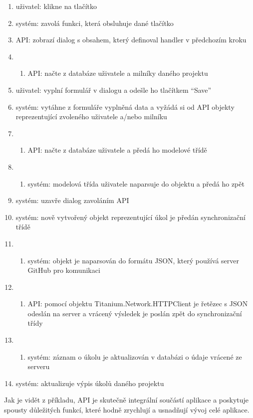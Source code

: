 \begin{enumerate}
\item uživatel: klikne na tlačítko 
\item systém: zavolá funkci, která obsluhuje dané tlačítko
\item API: zobrazí dialog s obsahem, který definoval handler v předchozím kroku
\item \begin{enumerate}
\item API: načte z databáze uživatele a milníky daného projektu
\end{enumerate}
\item uživatel: vyplní formulář v dialogu a odešle ho tlačítkem ``Save''
\item systém: vytáhne z formuláře vyplněná data a vyžádá si od API objekty reprezentující zvoleného uživatele a\slash nebo milníku
\item \begin{enumerate}
\item API: načte z databáze uživatele a předá ho modelové třídě
\end{enumerate}
\item \begin{enumerate}
\item systém: modelová třída uživatele naparsuje do objektu a předá ho zpět
\end{enumerate}
\item systém: uzavře dialog zavoláním API
\item systém: nově vytvořený objekt reprezentující úkol je předán synchronizační třídě
\item \begin{enumerate}
\item systém: objekt je naparsován do formátu JSON, který používá server GitHub pro komunikaci
\end{enumerate}
\item \begin{enumerate}
\item API: pomocí objektu Titanium.Network.HTTPClient je řetězec s JSON odeslán na server a vrácený výsledek je poslán zpět do synchronizační třídy
\end{enumerate}
\item \begin{enumerate}
\item systém: záznam o úkolu je aktualizován v databázi o údaje vrácené ze serveru
\end{enumerate}
\item systém: aktualizuje výpis úkolů daného projektu
\end{enumerate}

Jak je vidět z příkladu, API je skutečně integrální součástí aplikace a poskytuje spousty důležitých funkcí, které hodně zrychlují a usnadňují vývoj celé aplikace.